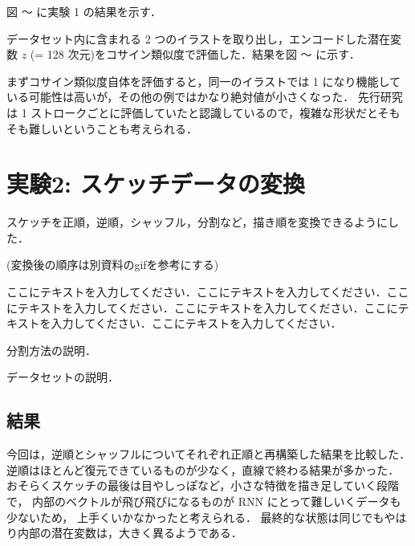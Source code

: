 \documentclass[twocolumn]{jarticle}     %
\begin{document}


図 ～ に実験 1 の結果を示す．

データセット内に含まれる 2 つのイラストを取り出し，エンコードした潜在変数 $z$ (= 128 次元)をコサイン類似度で評価した．結果を図 ～ に示す．

まずコサイン類似度自体を評価すると，同一のイラストでは 1 になり機能している可能性は高いが，その他の例ではかなり絶対値が小さくなった．
先行研究は 1 ストロークごとに評価していたと認識しているので，複雑な形状だとそもそも難しいということも考えられる．

\section{実験2: スケッチデータの変換}
スケッチを正順，逆順，シャッフル，分割など，描き順を変換できるようにした．

(変換後の順序は別資料のgifを参考にする)

ここにテキストを入力してください．ここにテキストを入力してください．ここにテキストを入力してください．ここにテキストを入力してください．ここにテキストを入力してください．ここにテキストを入力してください．

分割方法の説明．

データセットの説明．

\subsection{結果}

今回は，逆順とシャッフルについてそれぞれ正順と再構築した結果を比較した．
逆順はほとんど復元できているものが少なく，直線で終わる結果が多かった．
おそらくスケッチの最後は目やしっぽなど，小さな特徴を描き足していく段階で，
内部のベクトルが飛び飛びになるものが RNN にとって難しいくデータも少ないため，
上手くいかなかったと考えられる．
最終的な状態は同じでもやはり内部の潜在変数は，大きく異るようである．
\end{document}
